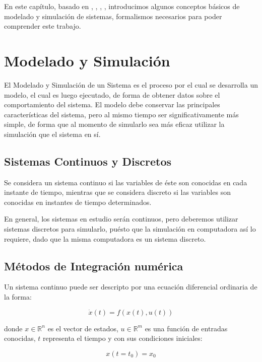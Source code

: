 	En este capítulo, basado en \cite{Fer12}, \cite{Ber12Th}, \cite{BK11}, \cite{BK13}, introducimos algunos conceptos básicos de modelado y 
	simulación de sistemas, formalismos necesarios para poder comprender este trabajo. 

\section{Modelado y Simulación}
	El Modelado y Simulación\cite{Zeigler} de un Sistema es el proceso por el cual se desarrolla un modelo, el cual es luego ejecutado, de forma de obtener datos 
	sobre el comportamiento del sistema.  El modelo debe conservar las principales características del sistema, pero al mismo tiempo ser significativamente 
	más simple, de forma que al momento de simularlo sea más eficaz utilizar la simulación que el sistema en sí.

	\subsection{Sistemas Continuos y Discretos}
	Se considera un sistema continuo si las variables de éste son conocidas en cada instante de tiempo, mientras que se considera discreto si las 
	variables son conocidas en instantes de tiempo determinados.

	En general, los sistemas en estudio serán continuos, pero deberemos utilizar sistemas discretos para simularlo, puésto que la simulación en 
	computadora así lo requiere, dado que la misma computadora es un sistema discreto.

	\subsection{Métodos de Integración numérica} \label{sec:num_integ}
	Un sistema continuo puede ser descripto por una ecuación diferencial ordinaria de la forma:

	\begin{equation} \label{eq:eq1}
	\dot{x}(t) = f (x(t), u(t))
	\end{equation}

	donde $x \in \mathbb{R}^n$  es el vector de estados, $u \in \mathbb{R}^m$ es una función de entradas conocidas,
	$t$ representa el tiempo y con sus condiciones iniciales:

	\begin{equation} \label{eq:eq2}
	x(t = t_0 ) = x_0
	\end{equation}

